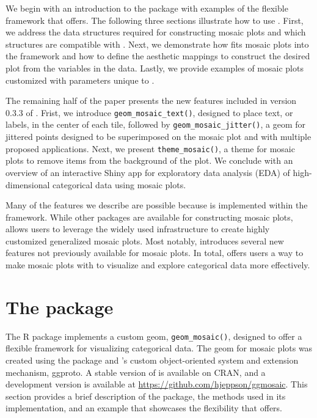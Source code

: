 We begin with an introduction to the package with examples of the flexible framework that  offers. The following three sections illustrate how to use . First, we address the data structures required for constructing mosaic plots and which structures are compatible with . Next, we demonstrate how  fits mosaic plots into the  framework and how to define the aesthetic mappings to construct the desired plot from the variables in the data. Lastly, we provide examples of mosaic plots customized with parameters unique to .

The remaining half of the paper presents the new features included in version 0.3.3 of . Frist, we introduce \texttt{geom\_mosaic\_text()}, designed to place text, or labels, in the center of each tile, followed by \texttt{geom\_mosaic\_jitter()}, a geom for jittered points designed to be superimposed on the mosaic plot and with multiple proposed applications. Next, we present \texttt{theme\_mosaic()}, a theme for mosaic plots to remove items from the background of the plot. We conclude with an overview of an interactive Shiny app for exploratory data analysis (EDA) of high-dimensional categorical data using mosaic plots.

Many of the features we describe are possible because  is implemented within the  framework. While other packages are available for constructing mosaic plots,  allows users to leverage the widely used  infrastructure to create highly customized generalized mosaic plots. Most notably,  introduces several new features not previously available for mosaic plots. In total,  offers users a way to make mosaic plots with  to visualize and explore categorical data more effectively.

\hypertarget{the-package}{%
\section*{\texorpdfstring{The  package}{The  package}}\label{the-package}}

The R package  implements a custom  geom, \texttt{geom\_mosaic()}, designed to offer a flexible framework for visualizing categorical data. The geom for mosaic plots was created using the  package and 's custom object-oriented system and extension mechanism, ggproto. A stable version of  is available on CRAN, and a development version is available at \url{https://github.com/hjeppson/ggmosaic}. This section provides a brief description of the package, the methods used in its implementation, and an example that showcases the flexibility that  offers.

